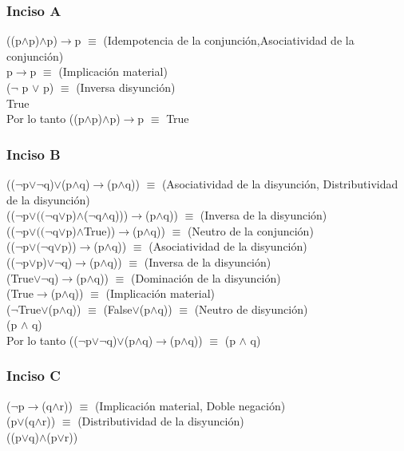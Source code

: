 		\subsubsection{Inciso A}
		((p$\wedge$p)$\wedge$p)$\rightarrow$p $\equiv$ (Idempotencia de la conjunción,Asociatividad de la conjunción)\\
		p$\rightarrow$p $\equiv$ (Implicación material)\\
		($\neg$ p $\vee$ p) $\equiv$ (Inversa disyunción)\\
		True\\
		
		Por lo tanto ((p$\wedge$p)$\wedge$p)$\rightarrow$p $\equiv$ True
		
		\subsubsection{Inciso B}
		(($\neg$p$\vee$$\neg$q)$\vee$(p$\wedge$q)$\rightarrow$(p$\wedge$q)) $\equiv$ (Asociatividad de la disyunción, Distributividad de la disyunción)\\
		(($\neg$p$\vee$$((\neg$q$\vee$p)$\wedge$($\neg$q$\wedge$q)))$\rightarrow$(p$\wedge$q)) $\equiv$ (Inversa de la disyunción)\\
		(($\neg$p$\vee$$((\neg$q$\vee$p)$\wedge$True))$\rightarrow$(p$\wedge$q)) $\equiv$ (Neutro de la conjunción)\\
		(($\neg$p$\vee$$(\neg$q$\vee$p))$\rightarrow$(p$\wedge$q)) $\equiv$ (Asociatividad de la disyunción)\\
		(($\neg$p$\vee$p)$\vee$$\neg$q)$\rightarrow$(p$\wedge$q)) $\equiv$ (Inversa de la disyunción)\\
		(True$\vee$$\neg$q)$\rightarrow$(p$\wedge$q)) $\equiv$ (Dominación de la disyunción)\\
		(True$\rightarrow$(p$\wedge$q)) $\equiv$ (Implicación material)\\
		($\neg$True$\vee$(p$\wedge$q)) $\equiv$ (False$\vee$(p$\wedge$q)) $\equiv$ (Neutro de disyunción)\\
		(p $\wedge$ q)\\
		
		Por lo tanto (($\neg$p$\vee$$\neg$q)$\vee$(p$\wedge$q)$\rightarrow$(p$\wedge$q)) $\equiv$ (p $\wedge$ q)
		
		\subsubsection{Inciso C}
		($\neg$p$\rightarrow$(q$\wedge$r)) $\equiv$ (Implicación material, Doble negación)\\
		(p$\vee$(q$\wedge$r)) $\equiv$ (Distributividad de la disyunción)\\
		((p$\vee$q)$\wedge$(p$\vee$r))\\
		
